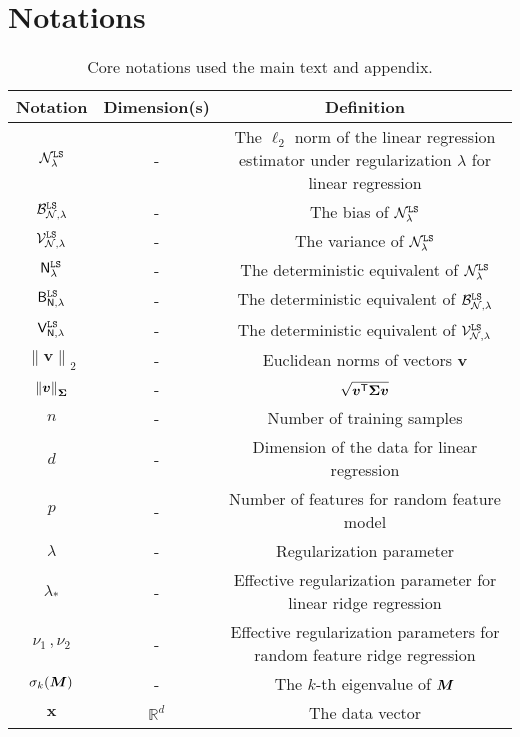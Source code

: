 \section{Notations}
\label{app:notation}

\begin{table}[H]
\begin{threeparttable}
\caption{Core notations used the main text and appendix.}
\label{table:symbols_and_notations}
\small
\centering
\fontsize{7}{7}\selectfont
\begin{tabular}{c | c | c}
\toprule
Notation & Dimension(s) & Definition \\
\midrule
\(\mathcal{N}_{\lambda}^{\tt LS}\) & - & The \(\ell_2\) norm of the linear regression estimator under regularization \(\lambda\) for linear regression \\
\(\mathcal{B}_{\mathcal{N},\lambda}^{\tt LS}\) & - & The bias of \(\mathcal{N}_{\lambda}^{\tt LS}\) \\
\(\mathcal{V}_{\mathcal{N},\lambda}^{\tt LS}\) & - & The variance of \(\mathcal{N}_{\lambda}^{\tt LS}\) \\ \midrule
\(\mathsf N_{\lambda}^{\tt LS}\) & - & The deterministic equivalent of \(\mathcal{N}_{\lambda}^{\tt LS}\) \\
\(\mathsf B_{\mathsf N, \lambda}^{\tt LS}\) & - & The deterministic equivalent of \(\mathcal{B}_{\mathcal{N},\lambda}^{\tt LS}\) \\
\(\mathsf V_{\mathsf N, \lambda}^{\tt LS}\) & - & The deterministic equivalent of \(\mathcal{V}_{\mathcal{N},\lambda}^{\tt LS}\) \\
\midrule
$\left \| \bm{v} \right \|_2$ & - & Euclidean norms of vectors $\bm{v}$ \\
$\left \| \bm{v} \right \|_{\boldsymbol \Sigma}$ & - & $\sqrt{{\boldsymbol v}^{\mathsf T} {\boldsymbol \Sigma} {\boldsymbol v}}$ \\
\midrule
$n$ & - & Number of training samples \\
$d$ & - & Dimension of the data for linear regression \\
$p$ & - & Number of features for random feature model \\
$\lambda$ & - & Regularization parameter \\
$\lambda_*$ & - & Effective regularization parameter for linear ridge regression \\
$\nu_1\,,\nu_2$ & - & Effective regularization parameters for random feature ridge regression \\
$\sigma_k({\boldsymbol M})$ & - & The $k$-th eigenvalue of ${\boldsymbol M}$ \\
\midrule
$\bm{x}$ & $\mathbb{R}^{d}$ & The data vector \\

\end{tabular}
\end{threeparttable}
\end{table}
